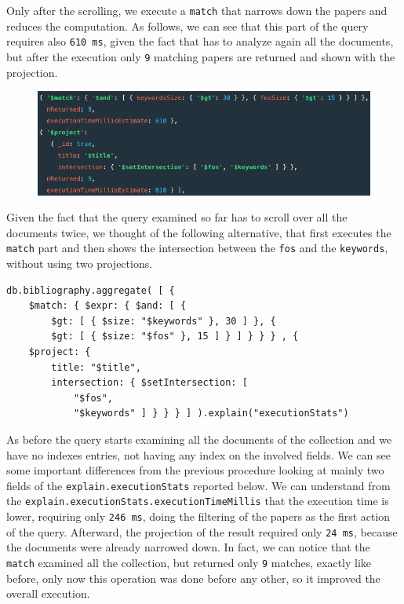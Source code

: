 \begin{enumerate}
\begin{figure}[H]
\begin{center}
            \label{fig:performanceV1}%
        \end{center}
    \end{figure}
    Only after the scrolling, we execute a \verb|match| that narrows down the papers and reduces the computation.
    As follows, we can see that this part of the query requires also \verb|610 ms|, given the fact that has to analyze again all the documents, but after the execution only \verb|9| matching papers are returned and shown with the projection.
    \begin{figure}[H]
        \begin{center}
            \includegraphics[width=0.6\linewidth]{ImagesMongoDB/performanceV1p1}
            \label{fig:performanceV1p1}%
        \end{center}
    \end{figure}
    Given the fact that the query examined so far has to scroll over all the documents twice, we thought of the following alternative, that first executes the \verb|match| part and then shows the intersection between the \verb|fos| and the \verb|keywords|, without using two projections.
    \begin{lstlisting}[label={lst:lstlisting67}]
db.bibliography.aggregate( [ {
    $match: { $expr: { $and: [ {
        $gt: [ { $size: "$keywords" }, 30 ] }, {
        $gt: [ { $size: "$fos" }, 15 ] } ] } } } , {
    $project: {
        title: "$title",
        intersection: { $setIntersection: [
            "$fos",
            "$keywords" ] } } } ] ).explain("executionStats")
    \end{lstlisting}
    As before the query starts examining all the documents of the collection and we have no indexes entries, not having any index on the involved fields.
    We can see some important differences from the previous procedure looking at mainly two fields of the \verb|explain.executionStats| reported below.
    We can understand from the \verb|explain.executionStats.executionTimeMillis| that the execution time is lower, requiring only \verb|246 ms|, doing the filtering of the papers as the first action of the query.
    Afterward, the projection of the result required only \verb|24 ms|, because the documents were already narrowed down.
    In fact, we can notice that the \verb|match| examined all the collection, but returned only \verb|9| matches, exactly like before, only now this operation was done before any other, so it improved the overall execution.

\end{enumerate}
